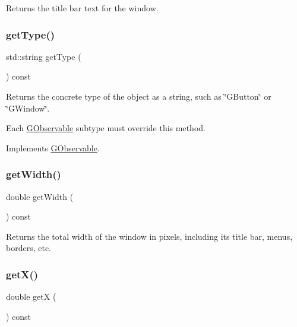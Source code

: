 Returns the title bar text for the window. 

\mbox{\label{classGWindow_a9896d58fcfebbf1025aeeb5b8b9ede80}} 
\subsubsection{\texorpdfstring{get\+Type()}{getType()}}
{\footnotesize\ttfamily std\+::string get\+Type (\begin{DoxyParamCaption}{ }\end{DoxyParamCaption}) const\hspace{0.3cm}{\ttfamily [virtual]}}



Returns the concrete type of the object as a string, such as {\ttfamily \char`\"{}\+G\+Button\char`\"{}} or {\ttfamily \char`\"{}\+G\+Window\char`\"{}}. 

Each \mbox{\hyperlink{classGObservable}{G\+Observable}} subtype must override this method. 

Implements \mbox{\hyperlink{classGObservable_a799e073a127b428cc841086d42ea4fed}{G\+Observable}}.

\mbox{\label{classGWindow_a0ed2965abd4f5701d2cadf71239faf19}} 
\subsubsection{\texorpdfstring{get\+Width()}{getWidth()}}
{\footnotesize\ttfamily double get\+Width (\begin{DoxyParamCaption}{ }\end{DoxyParamCaption}) const\hspace{0.3cm}{\ttfamily [virtual]}}



Returns the total width of the window in pixels, including its title bar, menus, borders, etc. 

\mbox{\label{classGWindow_a344385751bee0720059403940d57a13e}} 
\subsubsection{\texorpdfstring{get\+X()}{getX()}}
{\footnotesize\ttfamily double getX (\begin{DoxyParamCaption}{ }\end{DoxyParamCaption}) const\hspace{0.3cm}{\ttfamily [virtual]}}



